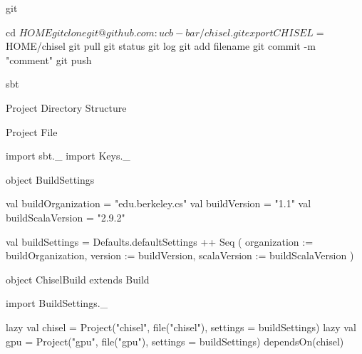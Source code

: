 \documentclass[xcolor=pdflatex,dvipsnames,table]{beamer}
\begin{document}
\begin{frame}[fragile]{git}
\begin{FramedVerb}
cd ${HOME}
git clone git@github.com:ucb-bar/chisel.git
export CHISEL=${HOME}/chisel
git pull
git status 
git log
git add filename
git commit -m "comment"
git push
\end{FramedVerb}
\end{frame}

\begin{frame}[fragile]{sbt}
\end{frame}

\begin{frame}[fragile]{Project Directory Structure}

\end{frame}

\begin{frame}[fragile]{Project File}

{
\begin{scala}
import sbt._
import Keys._

object BuildSettings {
  val buildOrganization = "edu.berkeley.cs"
  val buildVersion = "1.1"
  val buildScalaVersion = "2.9.2"

  val buildSettings = Defaults.defaultSettings ++ Seq (
    organization := buildOrganization,
    version      := buildVersion,
    scalaVersion := buildScalaVersion
  )
}

object ChiselBuild extends Build {
  import BuildSettings._

  lazy val chisel = 
    Project("chisel", file("chisel"), 
      settings = buildSettings)
  lazy val gpu =
    Project("gpu", file("gpu"), settings = buildSettings) 
      dependsOn(chisel)
}
\end{scala}
}

\end{frame}
\end{document}
